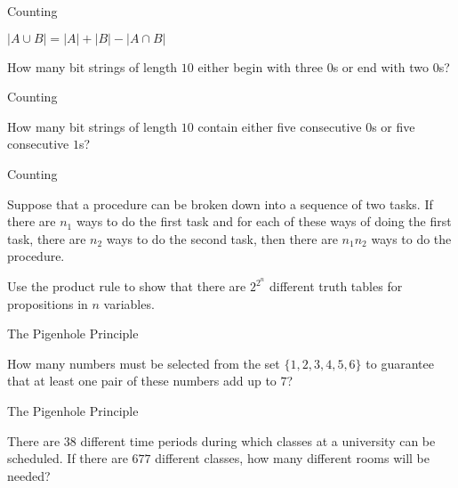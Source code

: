 \documentclass{beamer}
\begin{document}
\begin{frame}[t]{Counting}
    \begin{theorem}
        $|A \cup B| = |A| + |B| - |A \cap B|$
    \end{theorem}
    \begin{example}
        How many bit strings of length $10$ either begin with three $0$s or end with two $0$s?
    \end{example}
\end{frame}

\begin{frame}[t]{Counting}
    \begin{example}
        How many bit strings of length $10$ contain either five consecutive $0$s or five consecutive $1$s?
    \end{example}
\end{frame}

\begin{frame}[t]{Counting}
    \begin{theorem}
        Suppose that a procedure can be broken down into a sequence of two tasks. If there are $n_1$ ways to do the first task and for each of these ways of doing the first task, there are $n_2$ ways to do the second task, then there are $n_1n_2$ ways to do the procedure.
    \end{theorem}
    \begin{example}
        Use the product rule to show that there are $2^{2^n}$ different truth tables for propositions in $n$ variables.
    \end{example}
\end{frame}

\begin{frame}[t]{The Pigenhole Principle}
    \begin{example}
        How many numbers must be selected from the set $\{1, 2, 3, 4, 5, 6\}$ to guarantee that at least one pair of these numbers add up to $7$?
    \end{example}
\end{frame}

\begin{frame}[t]{The Pigenhole Principle}
    \begin{example}
        There are $38$ different time periods during which classes at a university can be scheduled. If there are $677$ different classes, how many different rooms will be needed?
    \end{example}
\end{frame}
\end{document}
